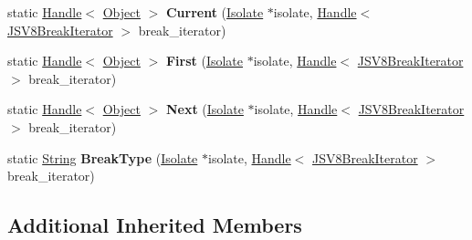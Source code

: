 \begin{DoxyCompactItemize}
\item 
\mbox{\label{classv8_1_1internal_1_1JSV8BreakIterator_aadde7acde94ea00a0a4aef606c2f47af}} 
static \mbox{\hyperlink{classv8_1_1internal_1_1Handle}{Handle}}$<$ \mbox{\hyperlink{classv8_1_1internal_1_1Object}{Object}} $>$ {\bfseries Current} (\mbox{\hyperlink{classv8_1_1internal_1_1Isolate}{Isolate}} $\ast$isolate, \mbox{\hyperlink{classv8_1_1internal_1_1Handle}{Handle}}$<$ \mbox{\hyperlink{classv8_1_1internal_1_1JSV8BreakIterator}{J\+S\+V8\+Break\+Iterator}} $>$ break\+\_\+iterator)
\item 
\mbox{\label{classv8_1_1internal_1_1JSV8BreakIterator_a83047f7dcd657ea199d9dc20b2fd572c}} 
static \mbox{\hyperlink{classv8_1_1internal_1_1Handle}{Handle}}$<$ \mbox{\hyperlink{classv8_1_1internal_1_1Object}{Object}} $>$ {\bfseries First} (\mbox{\hyperlink{classv8_1_1internal_1_1Isolate}{Isolate}} $\ast$isolate, \mbox{\hyperlink{classv8_1_1internal_1_1Handle}{Handle}}$<$ \mbox{\hyperlink{classv8_1_1internal_1_1JSV8BreakIterator}{J\+S\+V8\+Break\+Iterator}} $>$ break\+\_\+iterator)
\item 
\mbox{\label{classv8_1_1internal_1_1JSV8BreakIterator_aa1fa09f2c20e399bfcf20edac78be7a4}} 
static \mbox{\hyperlink{classv8_1_1internal_1_1Handle}{Handle}}$<$ \mbox{\hyperlink{classv8_1_1internal_1_1Object}{Object}} $>$ {\bfseries Next} (\mbox{\hyperlink{classv8_1_1internal_1_1Isolate}{Isolate}} $\ast$isolate, \mbox{\hyperlink{classv8_1_1internal_1_1Handle}{Handle}}$<$ \mbox{\hyperlink{classv8_1_1internal_1_1JSV8BreakIterator}{J\+S\+V8\+Break\+Iterator}} $>$ break\+\_\+iterator)
\item 
\mbox{\label{classv8_1_1internal_1_1JSV8BreakIterator_a1655c19d4df6d8f1f5f08f9ee5b74de4}} 
static \mbox{\hyperlink{classv8_1_1internal_1_1String}{String}} {\bfseries Break\+Type} (\mbox{\hyperlink{classv8_1_1internal_1_1Isolate}{Isolate}} $\ast$isolate, \mbox{\hyperlink{classv8_1_1internal_1_1Handle}{Handle}}$<$ \mbox{\hyperlink{classv8_1_1internal_1_1JSV8BreakIterator}{J\+S\+V8\+Break\+Iterator}} $>$ break\+\_\+iterator)
\end{DoxyCompactItemize}
\subsection*{Additional Inherited Members}


